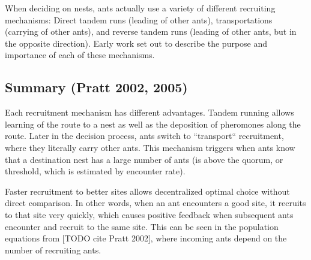 \documentclass[letterpaper]{article}
\makeatletter
\def\mcolor#1#{\@mcolor{#1}}
\def\@mcolor#1#2#3{%
  \protect\leavevmode
  \begingroup
    \color#1{#2}#3%
  \endgroup
}
\newcommand{\sitem}[1]
{
    \begin{itemize}
        \item #1
    \end{itemize}
}
\makeatother
\begin{document}

When deciding on nests, ants actually use a variety of different recruiting mechanisms: Direct tandem runs (leading of other ants), transportations (carrying of other ants), and reverse tandem runs (leading of other ants, but in the opposite direction). 
Early work set out to describe the purpose and importance of each of these mechanisms.

\subsection{Summary (Pratt 2002, 2005)}

Each recruitment mechanism has different advantages. Tandem running allows learning of the route to a nest as well as the deposition of pheromones along the route. 
Later in the decision process, ants switch to ``transport`` recruitment, where they literally carry other ants. 
This mechanism triggers when ants know that a destination nest has a large number of ants (is above the quorum, or threshold, which is estimated by encounter rate).

Faster recruitment to better sites allows decentralized optimal choice without direct comparison.
In other words, when an ant encounters a good site, it recruits to that site very quickly, which causes positive feedback when subsequent ants encounter and recruit to the same site.
This can be seen in the population equations from [TODO cite Pratt 2002], where incoming ants depend on the number of recruiting ants.
\end{document}
